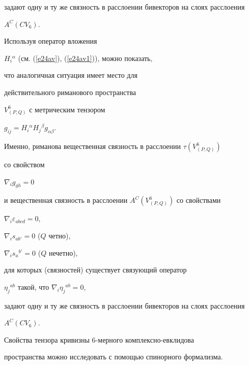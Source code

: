 задают одну и ту же связность в расслоении бивекторов на слоях расслоения


$A^C(CV_6)$.





Используя оператор вложения


$H_i{}^\alpha$ (см. (\ref{e24av}), (\ref{e24av1})), можно показать,


что аналогичная ситуация имеет место для


действительного риманового пространства


$V^6_{(P,Q)}$ с метрическим тензором


$g_{ij}=H_i{}^\alpha H_j{}^\beta g_{\alpha\beta}$.


Именно, риманова вещественная связность в расслоении $\tau(V^6_{(P,Q)})$


со свойством


$\nabla_i g_{gh}=0$


и вещественная связность в расслоении $A^C(V^6_{(P,Q)})$ со свойствами


$\nabla_i\varepsilon_{abcd}=0$,


$\nabla_is_{ab'}=0$ ($Q$ четно),


$\nabla_is_a{}^{b'}=0$ ($Q$ нечетно),


для которых (связностей) существует связующий оператор


$\eta_j{}^{ab}$ такой, что $\nabla_i \eta_j{}^{ab}=0$,


задают одну и ту же связность в расслоении бивекторов на слоях расслоения


$A^C(CV_6)$.





Свойства тензора кривизны 6-мерного комплексно-евклидова


пространства можно исследовать с помощью спинорного формализма.





